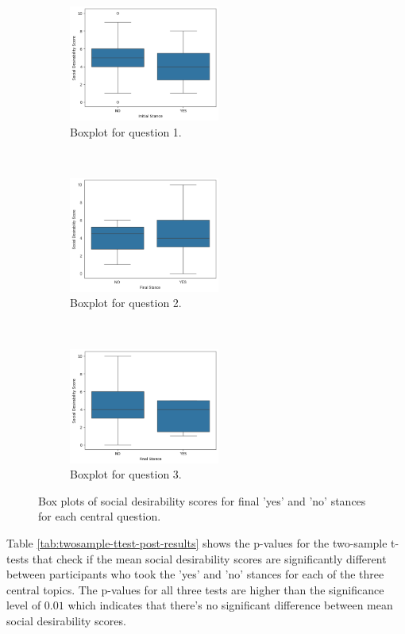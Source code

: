 \documentclass[journal]{IEEEtran}
\begin{document}
\begin{figure}[t!]
    \centering
    \begin{subfigure}[t]{0.3\textwidth}
        \centering
        \includegraphics[height=1.5in]{Fig/social_desirability_topic_33.png}
        \caption{Boxplot for question 1.}
        \label{graph:social-desirability-post-1}
    \end{subfigure}%
    ~
    \begin{subfigure}[t]{0.3\textwidth}
        \centering
        \includegraphics[height=1.5in]{Fig/post_social_desirability_48.png}
        \caption{Boxplot for question 2.}
        \label{graph:social-desirability-post-2}
    \end{subfigure}%
    ~
    \begin{subfigure}[t]{0.3\textwidth}
        \centering
        \includegraphics[height=1.5in]{Fig/post_social_desirability_73.png}
        \caption{Boxplot for question 3.}
        \label{graph:social-desirability-post-3}
    \end{subfigure}%
    \caption{Box plots of social desirability scores for final 'yes' and 'no' stances for each central question.}
    \label{graph:social-desirability-post-all}
\end{figure}

Table \ref{tab:twosample-ttest-post-results} shows the p-values for the two-sample t-tests that check if the mean social desirability scores are significantly different between participants who took the 'yes' and 'no' stances for each of the three central topics. The p-values for all three tests are higher than the significance level of $0.01$ which indicates that there's no significant difference between mean social desirability scores.
\end{document}
